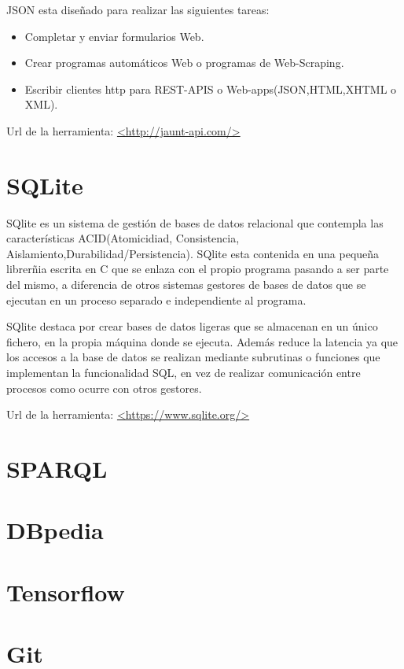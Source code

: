 JSON esta diseñado para realizar las siguientes tareas:
\begin{itemize}
	\item{Completar y enviar formularios Web.}
	\item{Crear programas automáticos Web o programas de Web-Scraping.}
	\item{Escribir clientes http para REST-APIS o Web-apps(JSON,HTML,XHTML o XML).}
\end{itemize}

Url de la herramienta: \url{<http://jaunt-api.com/>}
\section{SQLite}

SQlite es un sistema de gestión de bases de datos relacional que contempla las características ACID(Atomicidiad, Consistencia, Aislamiento,Durabilidad/Persistencia). SQlite esta contenida en una pequeña librerñia escrita en C que se enlaza con el propio programa pasando a ser parte del mismo, a diferencia de otros sistemas gestores de bases de datos que se ejecutan en un proceso separado e independiente al programa.

SQlite destaca por crear bases de datos ligeras que se almacenan en un único fichero, en la propia máquina donde se ejecuta. Además reduce la latencia ya que los accesos a la base de datos se realizan mediante subrutinas o funciones que implementan la funcionalidad SQL, en vez de realizar comunicación entre procesos como ocurre con otros gestores.\cite{wiki:SQlite}

Url de la herramienta: \url{<https://www.sqlite.org/>}

\section{SPARQL}

\section{DBpedia}

\section{Tensorflow}

\section{Git}

